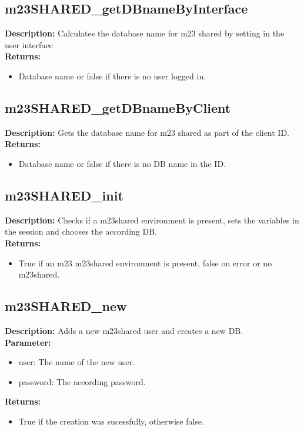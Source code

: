 \subsection{m23SHARED\_getDBnameByInterface}
\textbf{Description:} Calculates the database name for m23 shared by setting in the user interface\\
\textbf{Returns:}
\begin{itemize}
\item Database name or false if there is no user logged in.
\end{itemize}

\subsection{m23SHARED\_getDBnameByClient}
\textbf{Description:} Gets the database name for m23 shared as part of the client ID.\\
\textbf{Returns:}
\begin{itemize}
\item Database name or false if there is no DB name in the ID.
\end{itemize}

\subsection{m23SHARED\_init}
\textbf{Description:} Checks if a m23shared environment is present, sets the variables in the session and chooses the according DB.\\
\textbf{Returns:}
\begin{itemize}
\item True if an m23 m23shared environment is present, false on error or no m23shared.
\end{itemize}

\subsection{m23SHARED\_new}
\textbf{Description:} Adds a new m23shared user and creates a new DB.\\
\textbf{Parameter:}
\begin{itemize}
\item user: The name of the new user.
\item password: The according password.
\end{itemize}
\textbf{Returns:}
\begin{itemize}
\item True if the creation was sucessfully, otherwise false.
\end{itemize}

